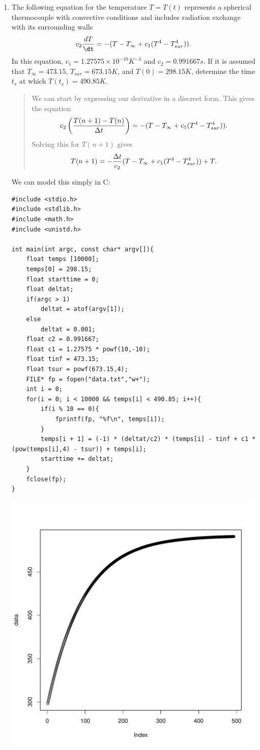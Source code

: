 \documentclass{hw}
\begin{document}
\begin{enumerate}
\item The following equation for the temperature $T=T(t)$ represents a spherical thermocouple with
convective conditions and includes radiation exchange with its surrounding walls
\[
c_{2}{dT\over\dt}=-(T-T_{\infty}+c_{1}(T^{4}-T^{4}_{sur})).
\]
In this equation, $c_{1}=1.27575\times10^{-10}K^{-3}$ and $c_{2}=0.991667s$. If it is assumed that
$T_{\infty}=473.15$, $T_{sur}=673.15K$, and $T(0)=298.15K$, determine the time $t_{s}$ at which
$T(t_{s})=490.85K$.
\begin{quote}
We can start by expressing our derivative in a discreet form. This gives the equation
\[
c_{2}\left({T(n+1)-T(n)\over\Delta t}\right)=-(T-T_{\infty}+c_{1}(T^{4}-T^{4}_{sur})).
\]
Solving this for $T(n+1)$ gives
\[
T(n+1)=-{\Delta t\over c_{2}}(T-T_{\infty}+c_{1}(T^{4}-T^{4}_{sur})) + T.
\]
\end{quote}
We can model this simply in C:

\begin{verbatim}
#include <stdio.h>
#include <stdlib.h>
#include <math.h>
#include <unistd.h>

int main(int argc, const char* argv[]){
    float temps [10000];
    temps[0] = 298.15;
    float starttime = 0;
    float deltat;
    if(argc > 1)
        deltat = atof(argv[1]);
    else
        deltat = 0.001;
    float c2 = 0.991667;
    float c1 = 1.27575 * powf(10,-10);
    float tinf = 473.15;
    float tsur = powf(673.15,4);
    FILE* fp = fopen("data.txt","w+");
    int i = 0;
    for(i = 0; i < 10000 && temps[i] < 490.85; i++){
        if(i % 10 == 0){
            fprintf(fp, "%f\n", temps[i]);
        }
        temps[i + 1] = (-1) * (deltat/c2) * (temps[i] - tinf + c1 * (pow(temps[i],4) - tsur)) + temps[i];
        starttime += deltat;
    }
    fclose(fp);
}
\end{verbatim}
\includegraphics[scale=0.3]{Rplots}


\end{enumerate}
\end{document}
